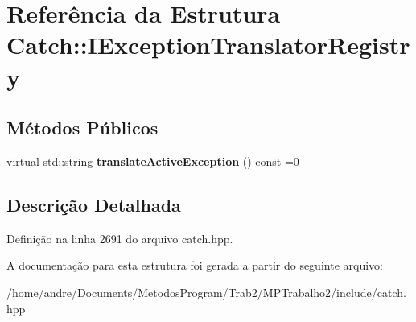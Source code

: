 \hypertarget{structCatch_1_1IExceptionTranslatorRegistry}{}\section{Referência da Estrutura Catch\+:\+:I\+Exception\+Translator\+Registry}
\label{structCatch_1_1IExceptionTranslatorRegistry}
\subsection*{Métodos Públicos}
\begin{DoxyCompactItemize}
\item 
virtual std\+::string {\bfseries translate\+Active\+Exception} () const =0\hypertarget{structCatch_1_1IExceptionTranslatorRegistry_af76ae8c331a17f2a94c9720bc0d686bb}{}\label{structCatch_1_1IExceptionTranslatorRegistry_af76ae8c331a17f2a94c9720bc0d686bb}

\end{DoxyCompactItemize}


\subsection{Descrição Detalhada}


Definição na linha 2691 do arquivo catch.\+hpp.



A documentação para esta estrutura foi gerada a partir do seguinte arquivo\+:\begin{DoxyCompactItemize}
\item 
/home/andre/\+Documents/\+Metodos\+Program/\+Trab2/\+M\+P\+Trabalho2/include/catch.\+hpp\end{DoxyCompactItemize}
